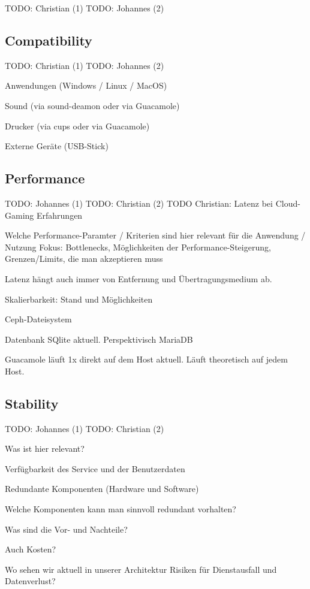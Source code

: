 \documentclass[runningheads]{llncs}
\begin{document}
TODO: Christian (1)
TODO: Johannes (2)

\subsection{Compatibility}

TODO: Christian (1)
TODO: Johannes (2)

Anwendungen (Windows / Linux / MacOS)

Sound (via sound-deamon oder via Guacamole)  

Drucker (via cups oder via Guacamole) 

Externe Geräte (USB-Stick)


\subsection{Performance}

TODO: Johannes (1)
TODO: Christian (2)
TODO Christian: Latenz bei Cloud-Gaming Erfahrungen

Welche Performance-Paramter / Kriterien sind hier relevant für die Anwendung / Nutzung
Fokus: Bottlenecks, Möglichkeiten der Performance-Steigerung, Grenzen/Limits, die man akzeptieren muss

Latenz hängt auch immer von Entfernung und Übertragungsmedium ab. 

Skalierbarkeit: Stand und Möglichkeiten

Ceph-Dateisystem 

Datenbank SQlite aktuell. Perspektivisch MariaDB

Guacamole läuft 1x direkt auf dem Host aktuell. Läuft theoretisch auf jedem Host.



\subsection{Stability}

TODO: Johannes (1)
TODO: Christian (2)

Was ist hier relevant?

Verfügbarkeit des Service und der Benutzerdaten

Redundante Komponenten (Hardware und Software)

Welche Komponenten kann man sinnvoll redundant vorhalten?

Was sind die Vor- und Nachteile?

Auch Kosten?

Wo sehen wir aktuell in unserer Architektur Risiken für Dienstausfall und Datenverlust?
\end{document}
